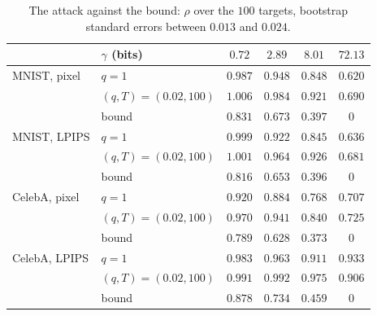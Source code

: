 \begin{table}[htbp]
    \centering\small
    \begin{tabular}{l l c c c c }
        \toprule
        & $\gamma$ (bits) & $0.72$ & $2.89$ & $8.01$ & $72.13$ \\
        \midrule
        MNIST, pixel & $q=1$ & $0.987$ & $0.948$ & $0.848$ & $0.620$ \\
                      & $(q,T)=(0.02,100)$ & $1.006$ & $0.984$ & $0.921$ & $0.690$ \\
                      & bound & $0.831$ & $0.673$ & $0.397$ & $0$ \\
        \midrule
        MNIST, LPIPS & $q=1$ & $0.999$ & $0.922$ & $0.845$ & $0.636$ \\
                      & $(q,T)=(0.02,100)$ & $1.001$ & $0.964$ & $0.926$ & $0.681$ \\
                      & bound & $0.816$ & $0.653$ & $0.396$ & $0$ \\
        \midrule
        CelebA, pixel & $q=1$ & $0.920$ & $0.884$ & $0.768$ & $0.707$ \\
                      & $(q,T)=(0.02,100)$ & $0.970$ & $0.941$ & $0.840$ & $0.725$ \\
                      & bound & $0.789$ & $0.628$ & $0.373$ & $0$ \\
        \midrule
        CelebA, LPIPS & $q=1$ & $0.983$ & $0.963$ & $0.911$ & $0.933$ \\
                      & $(q,T)=(0.02,100)$ & $0.991$ & $0.992$ & $0.975$ & $0.906$ \\
                      & bound & $0.878$ & $0.734$ & $0.459$ & $0$ \\
        \bottomrule
    \end{tabular}
    \caption{The attack against the bound: $\rho$ over the $100$ targets, bootstrap standard errors between $0.013$ and $0.024$.}
    \label{tab:attack_results}
\end{table}
